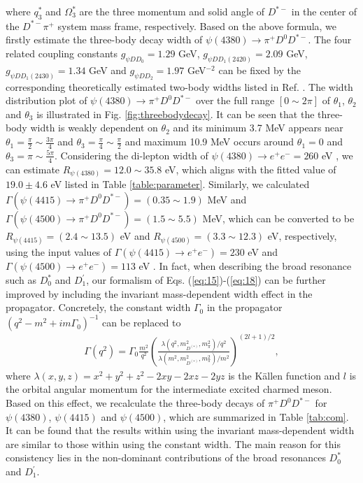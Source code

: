 \documentclass[final,5p,times,twocolumn]{elsarticle}
\begin{document}
where $q_3^*$ and $\Omega_3^*$ are the three momentum and solid angle of $D^{*-}$ in the center of the $D^{*-}\pi^{+}$ system mass frame, respectively. Based on the above formula, we firstly estimate the three-body decay width of $\psi(4380) \to \pi^{+}D^0D^{*-}$. The four related coupling constants $g_{\psi DD_0}=1.29$ GeV, $g_{\psi DD_1(2420)}=2.09$ GeV, $g_{\psi DD_1(2430)}=1.34$ GeV and  $g_{\psi DD_2}=1.97$ GeV$^{-2}$  can be fixed by the corresponding theoretically estimated two-body widths listed in Ref. \cite{Wang:2019mhs}. The width distribution plot of $\psi(4380) \to \pi^{+} D^0D^{*-}$ over the full range $[0\sim2\pi]$ of $\theta_1$, $\theta_2$ and $\theta_3$ is illustrated in Fig. \ref{fig:threebodydecay}. It can be seen that the three-body width is weakly dependent on $\theta_2$ and its minimum 3.7 MeV appears near $\theta_1=\frac{\pi}{2}\sim\frac{3\pi}{4}$ and $\theta_3=\frac{\pi}{4}\sim\frac{\pi}{2}$ and maximum 10.9 MeV occurs around $\theta_1=0$ and $\theta_3=\pi\sim\frac{5\pi}{4}$. Considering the di-lepton width of $\psi(4380)\to e^+e^-=260$ eV \cite{Wang:2019mhs}, we can estimate  $R_{\psi(4380)}=12.0\sim35.8$ eV, which aligns with the fitted value of $19.0\pm4.6$ eV listed in Table \ref{table:parameter}. Similarly, we calculated $\Gamma(\psi(4415)\to \pi^{+}D^0D^{*-})=(0.35\sim1.9)$ MeV and $\Gamma(\psi(4500)\to \pi^{+}D^0D^{*-})=(1.5\sim5.5)$ MeV, which can be converted to be $R_{\psi(4415)}=(2.4\sim13.5)$ eV and $R_{\psi(4500)}=(3.3\sim12.3)$ eV, respectively, using the input values of $\Gamma(\psi(4415)\to e^+e^-)=230$ eV \cite{BES:2007zwq,Wang:2019mhs} and $\Gamma(\psi(4500)\to e^+e^-)=113$ eV \cite{Wang:2019mhs}. { In fact, when describing the broad resonance such as $D_0^*$ and $D_1^{\prime}$, our formalism of Eqs. (\ref{eq:15})-(\ref{eq:18}) can be further improved by including the invariant mass-dependent width effect in the propagator. Concretely, the constant width $\Gamma_0$ in the propagator $(q^2-m^2+im\Gamma_0)^{-1}$ can be replaced to 
\begin{eqnarray}
\Gamma(q^2)=\Gamma_0\frac{m^2}{q^2}\left(\frac{\lambda(q^2,m_{D^{(*)}}^2,m_{\pi}^2)/q^2}{\lambda(m^2,m_{D^{(*)}}^2,m_{\pi}^2)/m^2}\right)^{(2l+1)/2},
\end{eqnarray}  
where $\lambda(x,y,z)=x^2+y^2+z^2-2xy-2xz-2yz$ is the K\"{a}llen function and $l$ is the orbital angular momentum for the intermediate excited charmed meson. Based on this effect, we recalculate the three-body decays of $\pi^+D^0D^{*-}$ for $\psi(4380)$, $\psi(4415)$ and $\psi(4500)$, which are summarized in Table \ref{tab:com}. It can be found that the results within using the invariant mass-dependent width are similar to those within using the constant width. The main reason for this consistency lies in the non-dominant contributions of the broad resonances $D_0^*$ and $D_1^{\prime}$.}
\end{document}
